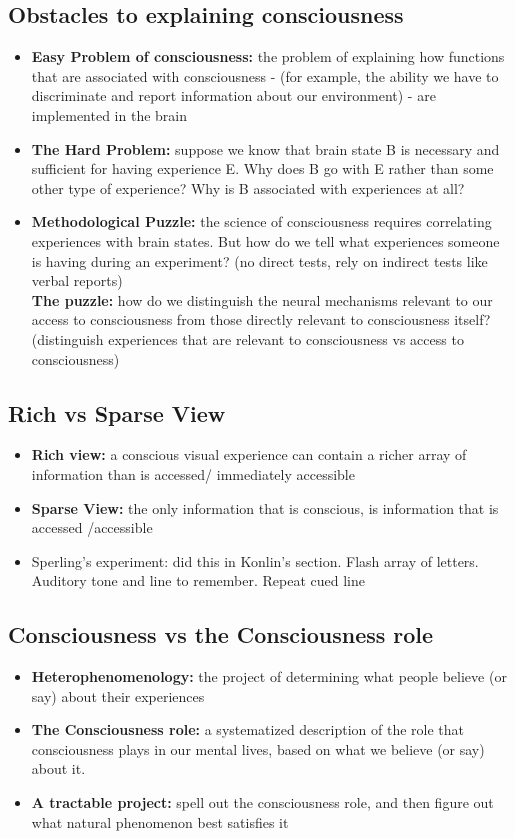 \documentclass{article}
\begin{document}
\subsection{Obstacles to explaining consciousness}
\begin{itemize}
    \item \textbf{Easy Problem of consciousness:} the problem of explaining how functions that are associated with consciousness - (for example, the ability we have to discriminate and report information about our environment) - are implemented in the brain
    \item \textbf{The Hard Problem:}  suppose we know that brain state B is necessary and sufficient for having experience E. Why does B go with E rather than some other type of experience? Why is B associated with experiences at all? 
    \item \textbf{Methodological Puzzle:} the science of consciousness requires correlating experiences with brain states. But how do we tell what experiences someone is having during an experiment? (no direct tests, rely on indirect tests like verbal reports) \\
    \textbf{The puzzle:} how do we distinguish the neural mechanisms relevant to our access to consciousness from those directly relevant to consciousness itself? (distinguish experiences that are relevant to consciousness vs access to consciousness) 
\end{itemize}

\subsection{Rich vs Sparse View}
\begin{itemize}
    \item \textbf{Rich view:} a conscious visual experience can contain a richer array of information than is accessed/ immediately accessible 
    \item \textbf{Sparse View:} the only information that is conscious, is information that is accessed /accessible
    \item Sperling's experiment: did this in Konlin's section. Flash array of letters. Auditory tone and line to remember. Repeat cued line
\end{itemize}

\subsection{Consciousness vs the Consciousness role}
\begin{itemize}
    \item \textbf{Heterophenomenology:} the project of determining what people believe (or say) about their experiences
    \item \textbf{The Consciousness role:} a systematized description of the role that consciousness plays in our mental lives, based on what we believe (or say) about it. 
    \item \textbf{A tractable project:} spell out the consciousness role, and then figure out what natural phenomenon best satisfies it
\end{itemize}
\end{document}

